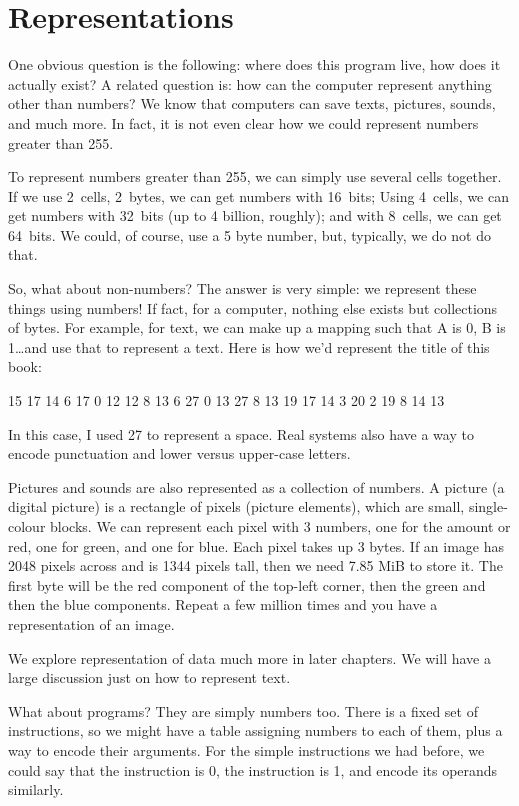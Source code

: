 \section{Representations}

One obvious question is the following: where does this program live, how does
it actually exist? A related question is: how can the computer represent
anything other than numbers? We know that computers can save texts, pictures,
sounds, and much more. In fact, it is not even clear how we could represent
numbers greater than 255.

To represent numbers greater than 255, we can simply use several cells
together. If we use 2~cells, 2~bytes, we can get numbers with 16~bits; Using
4~cells, we can get numbers with 32~bits (up to 4 billion, roughly); and with
8~cells, we can get 64~bits. We could, of course, use a 5 byte number, but,
typically, we do not do that.

So, what about non-numbers?  The answer is very simple: we represent these
things using numbers! If fact, for a computer, nothing else exists but
collections of bytes. For example, for text, we can make up a mapping such that
A is 0, B is 1\ldots and use that to represent a text. Here is how we'd
represent the title of this book:

15 17 14 6 17 0 12 12 8 13 6 27 0 13 27 8 13 19 17 14 3 20 2 19 8 14 13

In this case, I used 27 to represent a space. Real systems also have a way to
encode punctuation and lower versus upper-case letters.

\medskip

Pictures and sounds are also represented as a collection of numbers. A picture
(a digital picture) is a rectangle of pixels (picture elements), which are
small, single-colour blocks. We can represent each pixel with 3 numbers, one
for the amount or red, one for green, and one for blue. Each pixel takes up 3
bytes. If an image has 2048 pixels across and is 1344 pixels tall, then we need
7.85 MiB to store it. The first byte will be the red component of the top-left
corner, then the green and then the blue components. Repeat a few million times
and you have a representation of an image.

We explore representation of data much more in later chapters. We will have a
large discussion just on how to represent text.

What about programs? They are simply numbers too. There is a fixed set of
instructions, so we might have a table assigning numbers to each of them, plus
a way to encode their arguments. For the simple instructions we had before, we
could say that the  instruction is 0, the 
instruction is 1, and encode its operands similarly.


